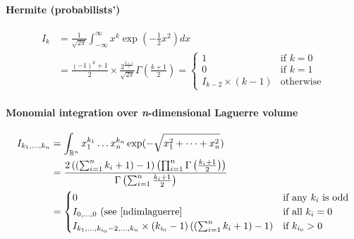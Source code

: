 \documentclass{scrartcl}
\begin{document}
\paragraph{Hermite (probabilists')}
\[
  \begin{split}
I_k
    &= \frac{1}{\sqrt{2\pi}} \int_{-\infty}^\infty x^k \exp\left(-\frac{1}{2}x^2\right) dx\\
    &= \frac{(-1)^k + 1}{2} \times \frac{2^{\frac{k+1}{2}}}{\sqrt{2\pi}}
    \Gamma\left(\frac{k+1}{2}\right)
    = \begin{cases}
      1&\text{if $k = 0$}\\
      0&\text{if $k = 1$}\\
      I_{k-2} \times (k-1)&\text{otherwise}
    \end{cases}
  \end{split}
\]

\paragraph{Monomial integration over \textit{n}-dimensional Laguerre volume}
\[
  \begin{split}
  I_{k_1,\dots,k_n}
  &= \int_{\mathbb{R}^n} x_1^{k_1}\dots x_n^{k_n} \exp(-\sqrt{x_1^2+\dots+x_n^2})\\
  &= \frac{
    2 \left(\left(\sum_{i=1}^n k_i+1\right) - 1\right)
    \left(\prod_{i=1}^n\Gamma\left(\frac{k_i + 1}{2}\right)\right)
  }{
    \Gamma\left(\sum_{i=1}^n\frac{k_i + 1}{2}\right)
  }\\
  &=\begin{cases}
    0&\text{if any $k_i$ is odd}\\
    I_{0,\dots,0} \text{ (see \eqref{ndimlaguerre}}&\text{if all $k_i=0$}\\
    I_{k_1,\dots,k_{i_0}-2,\dots,k_n} \times (k_{i_0} - 1) \left(\left(\sum_{i=1}^n
    k_i+1\right) - 1\right)&\text{if $k_{i_0} > 0$}
  \end{cases}
  \end{split}
\]
\end{document}
